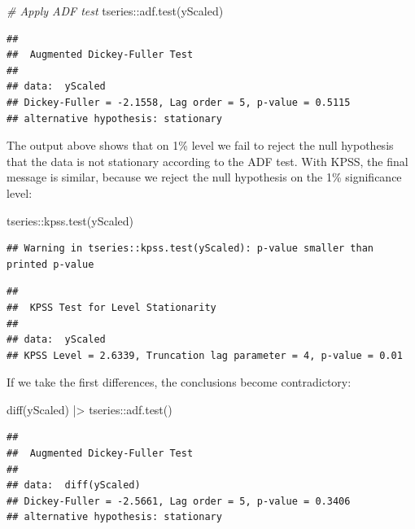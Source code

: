 \documentclass[
]{book}
\newenvironment{Shaded}{\begin{snugshade}}{\end{snugshade}}
\newcommand{\CommentTok}[1]{\textcolor[rgb]{0.56,0.35,0.01}{\textit{#1}}}
\newcommand{\FunctionTok}[1]{\textcolor[rgb]{0.00,0.00,0.00}{#1}}
\newcommand{\NormalTok}[1]{#1}
\newcommand{\SpecialCharTok}[1]{\textcolor[rgb]{0.00,0.00,0.00}{#1}}
\begin{document}
\begin{Shaded}
\begin{Highlighting}[]
\CommentTok{\# Apply ADF test}
\NormalTok{tseries}\SpecialCharTok{::}\FunctionTok{adf.test}\NormalTok{(yScaled)}
\end{Highlighting}
\end{Shaded}

\begin{verbatim}
## 
##  Augmented Dickey-Fuller Test
## 
## data:  yScaled
## Dickey-Fuller = -2.1558, Lag order = 5, p-value = 0.5115
## alternative hypothesis: stationary
\end{verbatim}

The output above shows that on 1\% level we fail to reject the null hypothesis that the data is not stationary according to the ADF test. With KPSS, the final message is similar, because we reject the null hypothesis on the 1\% significance level:

\begin{Shaded}
\begin{Highlighting}[]
\NormalTok{tseries}\SpecialCharTok{::}\FunctionTok{kpss.test}\NormalTok{(yScaled)}
\end{Highlighting}
\end{Shaded}

\begin{verbatim}
## Warning in tseries::kpss.test(yScaled): p-value smaller than printed p-value
\end{verbatim}

\begin{verbatim}
## 
##  KPSS Test for Level Stationarity
## 
## data:  yScaled
## KPSS Level = 2.6339, Truncation lag parameter = 4, p-value = 0.01
\end{verbatim}

If we take the first differences, the conclusions become contradictory:

\begin{Shaded}
\begin{Highlighting}[]
\FunctionTok{diff}\NormalTok{(yScaled) }\SpecialCharTok{|\textgreater{}}
\NormalTok{    tseries}\SpecialCharTok{::}\FunctionTok{adf.test}\NormalTok{()}
\end{Highlighting}
\end{Shaded}

\begin{verbatim}
## 
##  Augmented Dickey-Fuller Test
## 
## data:  diff(yScaled)
## Dickey-Fuller = -2.5661, Lag order = 5, p-value = 0.3406
## alternative hypothesis: stationary
\end{verbatim}
\end{document}
